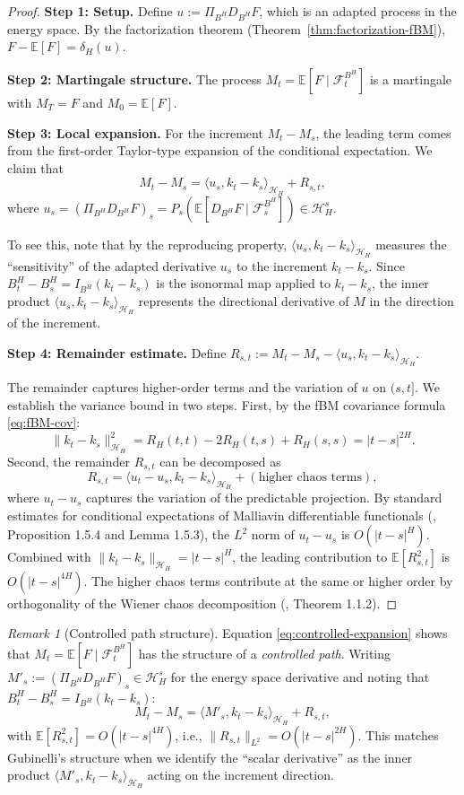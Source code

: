\documentclass[11pt,a4paper]{article}
\theoremstyle{plain}
\theoremstyle{definition}
\theoremstyle{remark}
\newtheorem{remark}[theorem]{Remark}
\newcommand{\E}{\mathbb{E}}
\newcommand{\ip}[2]{\langle #1, #2 \rangle}
\newcommand{\norm}[1]{\| #1 \|}
\newcommand{\Lp}[1]{L^{#1}}
\newcommand{\Ft}{\mathcal{F}_t}
\newcommand{\Fs}{\mathcal{F}_s}
\newcommand{\HH}{\mathcal{H}_H}
\begin{document}
\begin{proof}
\textbf{Step 1: Setup.}
Define $u := \Pi_{B^H} D_{B^H} F$, which is an adapted process in the energy space. By the factorization theorem (Theorem~\ref{thm:factorization-fBM}), $F - \E[F] = \delta_H(u)$.

\textbf{Step 2: Martingale structure.}
The process $M_t = \E[F \mid \Ft^{B^H}]$ is a martingale with $M_T = F$ and $M_0 = \E[F]$.

\textbf{Step 3: Local expansion.}
For the increment $M_t - M_s$, the leading term comes from the first-order Taylor-type expansion of the conditional expectation. We claim that
\[
M_t - M_s = \ip{u_s}{k_t - k_s}_{\HH} + R_{s,t},
\]
where $u_s = (\Pi_{B^H} D_{B^H} F)_s = P_s(\E[D_{B^H} F \mid \Fs^{B^H}]) \in \HH^s$.

To see this, note that by the reproducing property, $\ip{u_s}{k_t - k_s}_{\HH}$ measures the ``sensitivity'' of the adapted derivative $u_s$ to the increment $k_t - k_s$. Since $B^H_t - B^H_s = I_{B^H}(k_t - k_s)$ is the isonormal map applied to $k_t - k_s$, the inner product $\ip{u_s}{k_t - k_s}_{\HH}$ represents the directional derivative of $M$ in the direction of the increment.

\textbf{Step 4: Remainder estimate.}
Define $R_{s,t} := M_t - M_s - \ip{u_s}{k_t - k_s}_{\HH}$.

The remainder captures higher-order terms and the variation of $u$ on $(s,t]$. We establish the variance bound in two steps. First, by the fBM covariance formula \eqref{eq:fBM-cov}:
\[
\norm{k_t - k_s}^2_{\HH} = R_H(t,t) - 2R_H(t,s) + R_H(s,s) = |t-s|^{2H}.
\]
Second, the remainder $R_{s,t}$ can be decomposed as
\[
R_{s,t} = \ip{u_t - u_s}{k_t - k_s}_{\HH} + (\text{higher chaos terms}),
\]
where $u_t - u_s$ captures the variation of the predictable projection. By standard estimates for conditional expectations of Malliavin differentiable functionals (\cite{Nualart06}, Proposition 1.5.4 and Lemma 1.5.3), the $\Lp{2}$ norm of $u_t - u_s$ is $O(|t-s|^H)$. Combined with $\norm{k_t - k_s}_{\HH} = |t-s|^H$, the leading contribution to $\E[R_{s,t}^2]$ is $O(|t-s|^{4H})$. The higher chaos terms contribute at the same or higher order by orthogonality of the Wiener chaos decomposition (\cite{Nualart06}, Theorem 1.1.2).
\end{proof}

\begin{remark}[Controlled path structure]\label{rem:controlled}
Equation \eqref{eq:controlled-expansion} shows that $M_t = \E[F \mid \Ft^{B^H}]$ has the structure of a \emph{controlled path}. Writing $M'_s := (\Pi_{B^H} D_{B^H} F)_s \in \HH^s$ for the energy space derivative and noting that $B^H_t - B^H_s = I_{B^H}(k_t - k_s)$:
\[
M_t - M_s = \ip{M'_s}{k_t - k_s}_{\HH} + R_{s,t},
\]
with $\E[R_{s,t}^2] = O(|t-s|^{4H})$, i.e., $\norm{R_{s,t}}_{\Lp{2}} = O(|t-s|^{2H})$. This matches Gubinelli's structure when we identify the ``scalar derivative'' as the inner product $\ip{M'_s}{k_t - k_s}_{\HH}$ acting on the increment direction.
\end{remark}
\end{document}
